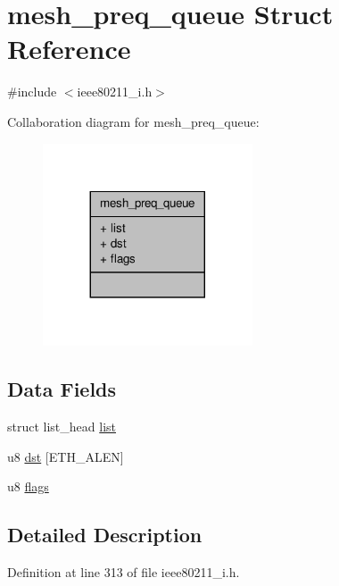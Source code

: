 \hypertarget{structmesh__preq__queue}{\section{mesh\-\_\-preq\-\_\-queue Struct Reference}
\label{structmesh__preq__queue}
}


{\ttfamily \#include $<$ieee80211\-\_\-i.\-h$>$}



Collaboration diagram for mesh\-\_\-preq\-\_\-queue\-:
\nopagebreak
\begin{figure}[H]
\begin{center}
\leavevmode
\includegraphics[width=176pt]{structmesh__preq__queue__coll__graph}
\end{center}
\end{figure}
\subsection*{Data Fields}
\begin{DoxyCompactItemize}
\item 
struct list\-\_\-head \hyperlink{structmesh__preq__queue_a1f00f18b91d5a820f2c43064243aa86e}{list}
\item 
u8 \hyperlink{structmesh__preq__queue_a7e206c9dbce55c0147656b4e271c71e4}{dst} \mbox{[}E\-T\-H\-\_\-\-A\-L\-E\-N\mbox{]}
\item 
u8 \hyperlink{structmesh__preq__queue_aa246fa433d167a7f6f8533227e40b76e}{flags}
\end{DoxyCompactItemize}


\subsection{Detailed Description}


Definition at line 313 of file ieee80211\-\_\-i.\-h.



